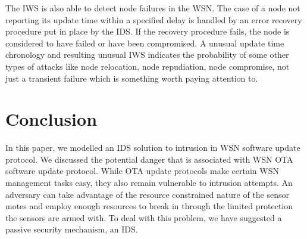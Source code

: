 \documentclass[conference]{IEEEtran}
\newcommand{\notedme}[1]{\raisebox{0pt}[0pt][0pt]{\pdfcomment[open=true,color=blue]{#1}}}
\begin{document}
The IWS is also able to detect node failures in the WSN.
The case of a node not reporting its update time within a specified delay is handled by an error recovery procedure put in place by the IDS.
If the recovery procedure fails, the node is considered to have failed or have been compromised.
A unusual update time chronology and resulting unusual IWS  indicates the probability of some other types of attacks like node relocation, node repudiation, node compromise, not just a transient failure which is something worth paying attention to.

\section{Conclusion}
\label{sec:concl}

In this paper, we modelled an IDS solution to intrusion in WSN software update protocol.
We discussed the potential danger that is associated with WSN OTA software update protocol.
While OTA update protocols make certain WSN management tasks easy, they also remain vulnerable to intrusion attempts.
An adversary can take advantage of the resource constrained nature of the sensor motes and employ enough resources to break in through the limited protection the sensors are armed with.
To deal with this problem, we have suggested a passive security mechanism, an IDS.
\end{document}
